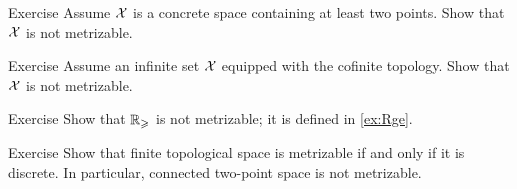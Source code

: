 \begin{thm}{Exercise}
Assume $\mathcal{X}$ is a concrete space containing at least two points.
Show that $\mathcal{X}$ is not metrizable.
\end{thm}

\begin{thm}{Exercise}
Assume an infinite set $\mathcal{X}$ equipped with the cofinite topology.
Show that $\mathcal{X}$ is not metrizable.
\end{thm}

\begin{thm}{Exercise}
Show that $\mathbb{R}_\geqslant$ is not metrizable; it is defined in \ref{ex:Rge}.
\end{thm}

\begin{thm}{Exercise}\label{ex:finite+metrizable}
Show that finite topological space is metrizable if and only if it is discrete.
In particular, connected two-point space is not metrizable.
\end{thm}


